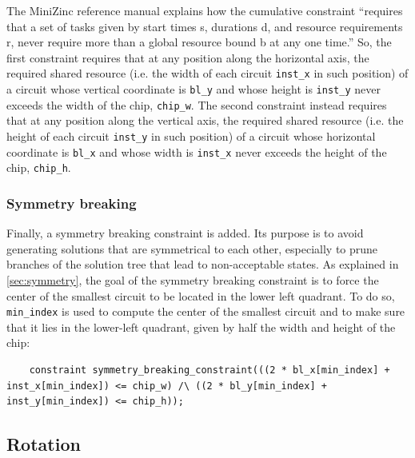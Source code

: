 \documentclass[a4paper, 12pt]{article}
\begin{document}
The MiniZinc reference manual explains how the cumulative constraint ``requires that a set of tasks given by start times s, durations d, and resource requirements r, never require more than a global resource bound b at any one time.'' So, the first constraint requires that at any position along the horizontal axis, the required shared resource (i.e. the width of each circuit \verb|inst_x| in such position) of a circuit whose vertical coordinate is \verb|bl_y| and whose height is \verb|inst_y| never exceeds the width of the chip, \verb|chip_w|. The second constraint instead requires that at any position along the vertical axis, the required shared resource (i.e. the height of each circuit \verb|inst_y| in such position) of a circuit whose horizontal coordinate is \verb|bl_x| and whose width is \verb|inst_x| never exceeds the height of the chip, \verb|chip_h|.


\subsubsection{Symmetry breaking}\label{sec:cp-symmetry}

Finally, a symmetry breaking constraint is added. Its purpose is to avoid generating solutions that are symmetrical to each other, especially to prune branches of the solution tree that lead to non-acceptable states. As explained in \cref{sec:symmetry}, the goal of the symmetry breaking constraint is to force the center of the smallest circuit to be located in the lower left quadrant. To do so, \verb|min_index| is used to compute the center of the smallest circuit and to make sure that it lies in the lower-left quadrant, given by half the width and height of the chip:
\begin{verbatim}
    constraint symmetry_breaking_constraint(((2 * bl_x[min_index] + inst_x[min_index]) <= chip_w) /\ ((2 * bl_y[min_index] + inst_y[min_index]) <= chip_h));
\end{verbatim}


\subsection{Rotation}
\end{document}
